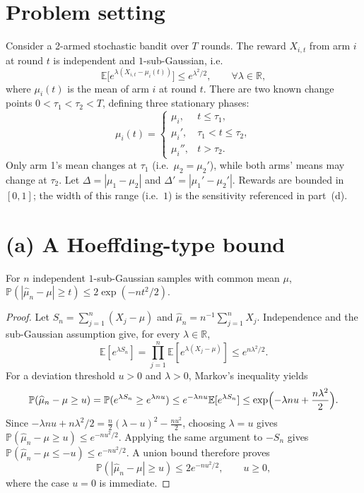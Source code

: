 \section{Problem setting}\label{sec:setting}

Consider a 2-armed stochastic bandit over $T$ rounds. The reward $X_{i,t}$ from arm $i$ at round $t$ is independent and $1$-sub-Gaussian, i.e.
\[
\mathbb E\bigl[e^{\lambda(X_{i,t}-\mu_i(t))}\bigr]\le e^{\lambda^2/2},\qquad \forall\lambda\in\mathbb R,
\]
where $\mu_i(t)$ is the mean of arm $i$ at round $t$. There are two known change points $0<\tau_1<\tau_2<T$, defining three stationary phases:
\[
\mu_i(t)=\begin{cases}\mu_i, & t\le\tau_1,\\ \mu_i', & \tau_1<t\le\tau_2,\\ \mu_i'', & t>\tau_2.\end{cases}
\]
Only arm 1's mean changes at $\tau_1$ (i.e.\ $\mu_2=\mu_2'$), while both arms' means may change at $\tau_2$. Let $\Delta=|\mu_1-\mu_2|$ and $\Delta'=|\mu_1'-\mu_2'|$. Rewards are bounded in $[0,1]$; the width of this range (i.e.\ $1$) is the sensitivity referenced in part~(d).

\section{(a) A Hoeffding-type bound}\label{sec:hoeffding}

\begin{proposition}
For $n$ independent $1$-sub-Gaussian samples with common mean $\mu$, $\mathbb P(|\widehat\mu_n-\mu|\ge t)\le 2\exp(-nt^2/2)$.
\end{proposition}

\begin{proof}
Let $S_n=\sum_{j=1}^n(X_j-\mu)$ and $\widehat\mu_n=n^{-1}\sum_{j=1}^nX_j$. Independence and the sub-Gaussian assumption give, for every $\lambda\in\mathbb R$,
\[
\mathbb E[e^{\lambda S_n}]=\prod_{j=1}^n\mathbb E[e^{\lambda(X_j-\mu)}]\le e^{n\lambda^2/2}.
\]
For a deviation threshold $u>0$ and $\lambda>0$, Markov's inequality yields
\[
\mathbb P(\widehat\mu_n-\mu\ge u)=\mathbb P(e^{\lambda S_n}\ge e^{\lambda nu})\le e^{-\lambda nu}\mathbb E[e^{\lambda S_n}]\le\exp\Bigl(-\lambda nu+\frac{n\lambda^2}{2}\Bigr).
\]
Since $-\lambda nu+n\lambda^2/2=\tfrac n2(\lambda-u)^2-\tfrac{nu^2}2$, choosing $\lambda=u$ gives $\mathbb P(\widehat\mu_n-\mu\ge u)\le e^{-nu^2/2}$. Applying the same argument to $-S_n$ gives $\mathbb P(\widehat\mu_n-\mu\le-u)\le e^{-nu^2/2}$. A union bound therefore proves
\begin{equation}\label{eq:hoeffding}
\mathbb P(|\widehat\mu_n-\mu|\ge u)\le 2e^{-nu^2/2},\qquad u\ge0,
\end{equation}
where the case $u=0$ is immediate.
\end{proof}

